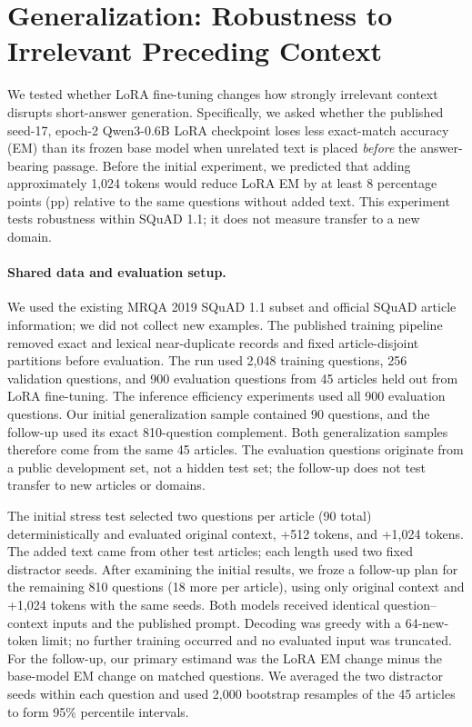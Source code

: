 \section{Generalization: Robustness to Irrelevant Preceding Context}
\label{sec:generalization}

We tested whether LoRA fine-tuning changes how strongly irrelevant context disrupts short-answer generation. Specifically, we asked whether the published seed-17, epoch-2 Qwen3-0.6B LoRA checkpoint loses less exact-match accuracy (EM) than its frozen base model when unrelated text is placed \emph{before} the answer-bearing passage. Before the initial experiment, we predicted that adding approximately 1,024 tokens would reduce LoRA EM by at least 8 percentage points (pp) relative to the same questions without added text. This experiment tests robustness within SQuAD 1.1; it does not measure transfer to a new domain.

\paragraph{Shared data and evaluation setup.} We used the existing MRQA 2019 SQuAD 1.1 subset and official SQuAD article information; we did not collect new examples. The published training pipeline removed exact and lexical near-duplicate records and fixed article-disjoint partitions before evaluation. The run used 2,048 training questions, 256 validation questions, and 900 evaluation questions from 45 articles held out from LoRA fine-tuning. The inference efficiency experiments used all 900 evaluation questions. Our initial generalization sample contained 90 questions, and the follow-up used its exact 810-question complement. Both generalization samples therefore come from the same 45 articles. The evaluation questions originate from a public development set, not a hidden test set; the follow-up does not test transfer to new articles or domains.

The initial stress test selected two questions per article (90 total) deterministically and evaluated original context, +512 tokens, and +1,024 tokens. The added text came from other test articles; each length used two fixed distractor seeds. After examining the initial results, we froze a follow-up plan for the remaining 810 questions (18 more per article), using only original context and +1,024 tokens with the same seeds. Both models received identical question--context inputs and the published prompt. Decoding was greedy with a 64-new-token limit; no further training occurred and no evaluated input was truncated. For the follow-up, our primary estimand was the LoRA EM change minus the base-model EM change on matched questions. We averaged the two distractor seeds within each question and used 2,000 bootstrap resamples of the 45 articles to form 95\% percentile intervals.

